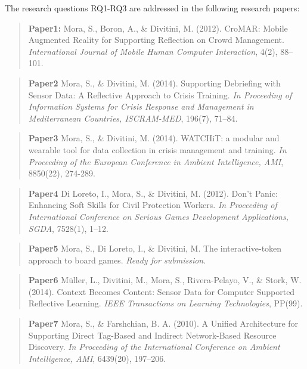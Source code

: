 The research questions RQ1-RQ3 are addressed in the following research papers:
\begin{quote}
	\textbf{Paper1:} Mora, S., Boron, A., \& Divitini, M. (2012). CroMAR: Mobile Augmented Reality for Supporting Reflection on Crowd Management. \emph{International Journal of Mobile Human Computer Interaction}, 4(2), 88--101. 
\end{quote}
\begin{quote}
	\textbf{Paper2} Mora, S., \& Divitini, M. (2014). Supporting Debriefing with Sensor Data: A Reflective Approach to Crisis Training. \emph{In Proceeding of Information Systems for Crisis Response and Management in Mediterranean Countries, ISCRAM-MED}, 196(7), 71--84. 
\end{quote}
\begin{quote}
	\textbf{Paper3} Mora, S., \& Divitini, M. (2014). WATCHiT: a modular and wearable tool for data collection in crisis management and training. \emph{In Proceeding of the European Conference in Ambient Intelligence, AMI}, 8850(22), 274-289. 
\end{quote}
\begin{quote}
	\textbf{Paper4} Di Loreto, I., Mora, S., \& Divitini, M. (2012). Don't Panic: Enhancing Soft Skills for Civil Protection Workers. \emph{In Proceeding of International Conference on Serious Games Development Applications, SGDA}, 7528(1), 1--12. 
\end{quote}
\begin{quote}
	\textbf{Paper5} Mora, S., Di Loreto, I., \& Divitini, M. The interactive-token approach to board games. \emph{Ready for submission}. 
\end{quote}
\begin{quote}
	\textbf{Paper6} Müller, L., Divitini, M., Mora, S., Rivera-Pelayo, V., \& Stork, W. (2014). Context Becomes Content: Sensor Data for Computer Supported Reflective Learning. \emph{IEEE Transactions on Learning Technologies}, PP(99). 
\end{quote}
\begin{quote}
	\textbf{Paper7} Mora, S., \& Farshchian, B. A. (2010). A Unified Architecture for Supporting Direct Tag-Based and Indirect Network-Based Resource Discovery. \emph{In Proceeding of the International Conference on Ambient Intelligence, AMI}, 6439(20), 197--206. 
\end{quote}

